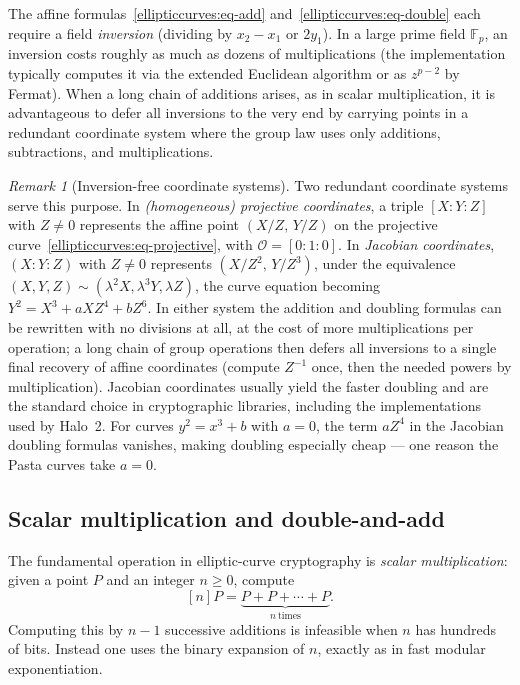 \documentclass[11pt,a4paper]{article}
\theoremstyle{definition}
\theoremstyle{remark}
\newtheorem{remark}[theorem]{Remark}
\newcommand{\Fp}{\ensuremath{\mathbb{F}_{p}}}
\begin{document}
The affine formulas~\eqref{ellipticcurves:eq-add} and~\eqref{ellipticcurves:eq-double} each require a field \emph{inversion} (dividing by \(x_2 - x_1\) or \(2 y_1\)). In a large prime field \(\Fp\), an inversion costs roughly as much as dozens of multiplications (the implementation typically computes it via the extended Euclidean algorithm or as \(z^{p-2}\) by Fermat). When a long chain of additions arises, as in scalar multiplication, it is advantageous to defer all inversions to the very end by carrying points in a redundant coordinate system where the group law uses only additions, subtractions, and multiplications.

\begin{remark}[Inversion-free coordinate systems]\label{ellipticcurves:rem-coords}
Two redundant coordinate systems serve this purpose. In \emph{(homogeneous) projective coordinates}, a triple \([X : Y : Z]\) with \(Z \neq 0\) represents the affine point \((X/Z,\, Y/Z)\) on the projective curve~\eqref{ellipticcurves:eq-projective}, with \(\mathcal O = [0:1:0]\). In \emph{Jacobian coordinates}, \((X : Y : Z)\) with \(Z \neq 0\) represents \((X/Z^2,\, Y/Z^3)\), under the equivalence \((X,Y,Z) \sim (\lambda^2 X, \lambda^3 Y, \lambda Z)\), the curve equation becoming \(Y^2 = X^3 + aXZ^4 + bZ^6\). In either system the addition and doubling formulas can be rewritten with no divisions at all, at the cost of more multiplications per operation; a long chain of group operations then defers all inversions to a single final recovery of affine coordinates (compute \(Z^{-1}\) once, then the needed powers by multiplication). Jacobian coordinates usually yield the faster doubling and are the standard choice in cryptographic libraries, including the implementations used by Halo~2. For curves \(y^2 = x^3 + b\) with \(a = 0\), the term \(aZ^4\) in the Jacobian doubling formulas vanishes, making doubling especially cheap --- one reason the Pasta curves take \(a = 0\).
\end{remark}

\subsection{Scalar multiplication and double-and-add}

The fundamental operation in elliptic-curve cryptography is \emph{scalar multiplication}: given a point \(P\) and an integer \(n \geq 0\), compute
\[
  [n]P = \underbrace{P + P + \cdots + P}_{n\ \text{times}} .
\]
Computing this by \(n - 1\) successive additions is infeasible when \(n\) has hundreds of bits. Instead one uses the binary expansion of \(n\), exactly as in fast modular exponentiation.
\end{document}
